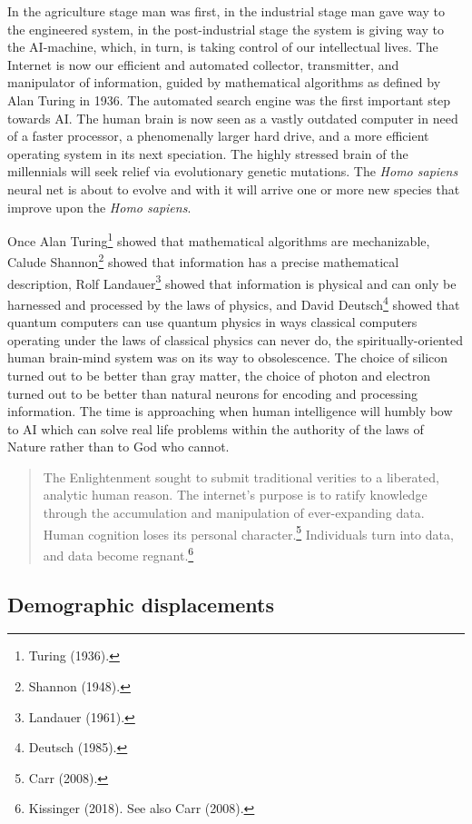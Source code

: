 \begin{multicols}{2}
In the agriculture stage man was first, in the industrial stage man gave way to the engineered system, in the post-industrial stage the system is giving way to the AI-machine, which, in turn, is taking control of our intellectual lives. The Internet is now our efficient and automated collector, transmitter, and manipulator of information, guided by mathematical algorithms as defined by Alan Turing in 1936. The automated search engine was the first important step towards AI. The human brain is now seen
as a vastly outdated computer in need of a faster processor, a phenomenally larger hard drive, and a more efficient operating system in its next speciation. The highly stressed brain of the millennials will seek relief via evolutionary genetic mutations. The \textit{Homo sapiens} neural net is about to evolve and with it will arrive one or more new species that improve upon the \textit{Homo sapiens}.

Once Alan Turing\footnote{Turing (1936).} showed that mathematical algorithms are mechanizable, Calude Shannon\footnote{Shannon (1948).} showed that information has a precise mathematical description, Rolf Landauer\footnote{Landauer (1961).}  showed that information is physical and can only be harnessed and processed by the laws of physics, and David Deutsch\footnote{Deutsch (1985).}  showed that quantum computers can use quantum physics in ways classical computers operating under the laws of classical physics can never do, the spiritually-oriented human brain-mind system was on its way to obsolescence. The choice of silicon turned out to be better than gray matter, the choice of photon and electron turned out to be better than natural neurons for encoding and processing information. The time is approaching when human intelligence will humbly bow to AI which can solve real life problems within the authority of the laws of Nature rather than to God who cannot.

\begin{quote}
The Enlightenment sought to submit traditional verities to a liberated, analytic human reason. The internet's purpose is to ratify knowledge through the accumulation and manipulation of ever-expanding data. Human cognition loses its personal character.\footnote{Carr (2008).} Individuals turn into data, and data become regnant.\footnote{Kissinger (2018). See also Carr (2008).}
\end{quote}

\subsection*{Demographic displacements}


\end{multicols}
